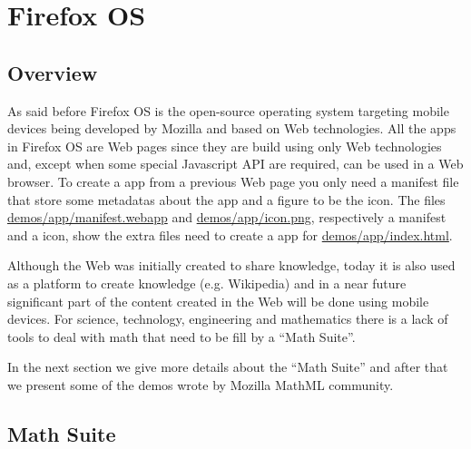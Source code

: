 \section{Firefox OS}

\subsection{Overview}

As said before
Firefox OS is the open-source operating system targeting mobile devices being
developed by Mozilla and based on Web technologies. All the apps in Firefox OS
are Web pages since they are build using only Web technologies and, except when
some special Javascript API are required, can be used in a Web browser.
To create a app from a previous Web page you only need a manifest
file that store some metadatas about the app and a figure to be the icon. The
files
\href{http://fred-wang.github.io/MathUI2014/demos/app/manifest.webapp}{demos/app/manifest.webapp}
and
\href{http://fred-wang.github.io/MathUI2014/demos/app/icon.png}{demos/app/icon.png},
respectively a manifest and a icon,
show the extra files need to create a app for
\href{http://fred-wang.github.io/MathUI2014/demos/app/index.html}{demos/app/index.html}.

Although the Web was initially created to share knowledge, today it is also used
as a platform to create knowledge (e.g. Wikipedia) and in a near future
significant part of the content created in the Web will be done using mobile
devices. For science, technology, engineering and mathematics there is a lack of
tools to deal with math that need to be fill by a ``Math Suite''.

In the next section we give more details about the ``Math Suite'' and
after that we present some of the demos wrote by Mozilla MathML community.

\subsection{Math Suite}

